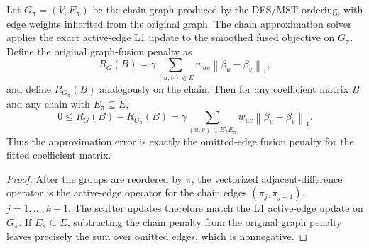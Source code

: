 \documentclass[twoside,11pt]{article}
\newcommand{\norm}[1]{\left\lVert #1 \right\rVert}
\begin{document}
\begin{proposition}
\label{prop:chain-target}
\leavevmode\par\noindent
Let $G_\pi=(V,E_\pi)$ be the chain graph produced by the DFS/MST ordering, with
edge weights inherited from the original graph. The chain approximation solver
applies the exact active-edge L1 update to the smoothed fused objective on
$G_\pi$. Define the original graph-fusion penalty as
\[
  R_G(B)=\gamma\sum_{(u,v)\in E}
  w_{uv}\norm{\beta_u-\beta_v}_1,
\]
and define $R_{G_\pi}(B)$ analogously on the chain. Then for any coefficient
matrix $B$ and any chain with $E_\pi\subseteq E$,
\[
  0 \leq R_G(B)-R_{G_\pi}(B)
  =
  \gamma\sum_{(u,v)\in E\setminus E_\pi}
  w_{uv}\norm{\beta_u-\beta_v}_1.
\]
Thus the approximation error is exactly the omitted-edge fusion penalty for
the fitted coefficient matrix.
\end{proposition}

\begin{proof}
After the groups are reordered by $\pi$, the vectorized adjacent-difference
operator is the active-edge operator for the chain edges
$(\pi_j,\pi_{j+1})$, $j=1,\ldots,k-1$. The scatter updates therefore match the
L1 active-edge update on $G_\pi$. If $E_\pi\subseteq E$, subtracting the chain
penalty from the original graph penalty leaves precisely the sum over omitted
edges, which is nonnegative.
\end{proof}
\end{document}
